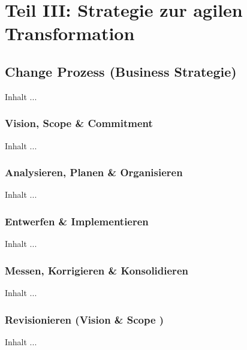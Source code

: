 
\chapter{Teil III: Strategie zur agilen Transformation}
\minitoc 
\vspace{1 cm} 

\section{Change Prozess (Business Strategie)}
Inhalt ...

\subsection{Vision, Scope \& Commitment}
Inhalt ...

\subsection{Analysieren, Planen \& Organisieren}
Inhalt ...

\subsection{Entwerfen \& Implementieren}
Inhalt ...

\subsection{Messen, Korrigieren \& Konsolidieren}
Inhalt ...

\subsection{Revisionieren (Vision \& Scope )}
Inhalt ...






